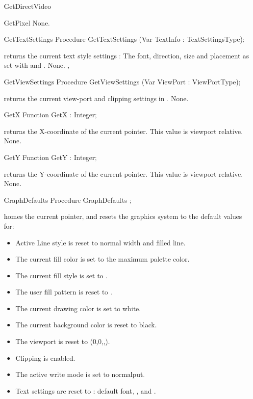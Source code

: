 \begin{function}{GetDirectVideo}
\begin{function}{GetPixel}
\Errors
None.
\SeeAlso

\end{function}
\begin{procedure}{GetTextSettings}
\Declaration
Procedure GetTextSettings (Var TextInfo : TextSettingsType);

\Description
{} returns the current text style settings : The font,
direction, size and placement as set with  and
.
\Errors
None.
\SeeAlso
{}, 

\end{procedure}
\begin{procedure}{GetViewSettings}
\Declaration
Procedure GetViewSettings (Var ViewPort : ViewPortType);

\Description
{} returns the current view-port and clipping settings in
.
\Errors
None.
\SeeAlso
{}
\end{procedure}

\begin{function}{GetX}
\Declaration
Function GetX  : Integer;

\Description
{} returns the X-coordinate of the current pointer. This value is
viewport relative.
\Errors
None.
\SeeAlso
{}
\end{function}
\begin{function}{GetY}
\Declaration
Function GetY  : Integer;

\Description
{} returns the Y-coordinate of the current pointer. This value is
viewport relative.
\Errors
None.
\SeeAlso
{}
\end{function}
\begin{procedure}{GraphDefaults}
\Declaration
Procedure GraphDefaults ;

\Description
{} homes the current pointer, and resets the graphics
system to the default values for:

\begin{itemize}
 \item Active Line style is reset to normal width and filled line.
 \item The current fill color is set to the maximum palette color.
 \item The current fill style is set to .
 \item The user fill pattern is reset to .
 \item The current drawing color is set to white.
 \item The current background color is reset to black.
 \item The viewport is reset to (0,0,,).
 \item Clipping is enabled.
 \item The active write mode is set to normalput.
 \item Text settings are reset to : default font, ,
          and .
\end{itemize}


\end{procedure}
\end{function}
